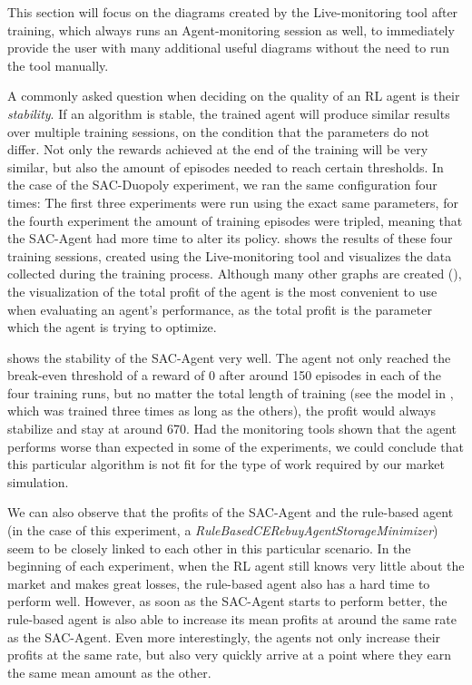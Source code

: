 This section will focus on the diagrams created by the Live-monitoring tool after training, which always runs an Agent-monitoring session as well, to immediately provide the user with many additional useful diagrams without the need to run the tool manually.

A commonly asked question when deciding on the quality of an RL agent is their \emph{stability}. If an algorithm is stable, the trained agent will produce similar results over multiple training sessions, on the condition that the parameters do not differ. Not only the rewards achieved at the end of the training will be very similar, but also the amount of episodes needed to reach certain thresholds. In the case of the SAC-Duopoly experiment, we ran the same configuration four times: The first three experiments were run using the exact same parameters, for the fourth experiment the amount of training episodes were tripled, meaning that the SAC-Agent had more time to alter its policy.  shows the results of these four training sessions, created using the Live-monitoring tool and visualizes the data collected during the training process. Although many other graphs are created (), the visualization of the total profit of the agent is the most convenient to use when evaluating an agent's performance, as the total profit is the parameter which the agent is trying to optimize.

 shows the stability of the SAC-Agent very well. The agent not only reached the break-even threshold of a reward of 0 after around 150 episodes in each of the four training runs, but no matter the total length of training (see the model in , which was trained three times as long as the others), the profit would always stabilize and stay at around 670. Had the monitoring tools shown that the agent performs worse than expected in some of the experiments, we could conclude that this particular algorithm is not fit for the type of work required by our market simulation.

We can also observe that the profits of the SAC-Agent and the rule-based agent (in the case of this experiment, a \emph{RuleBasedCERebuyAgentStorageMinimizer}) seem to be closely linked to each other in this particular scenario. In the beginning of each experiment, when the RL agent still knows very little about the market and makes great losses, the rule-based agent also has a hard time to perform well. However, as soon as the SAC-Agent starts to perform better, the rule-based agent is also able to increase its mean profits at around the same rate as the SAC-Agent. Even more interestingly, the agents not only increase their profits at the same rate, but also very quickly arrive at a point where they earn the same mean amount as the other.

